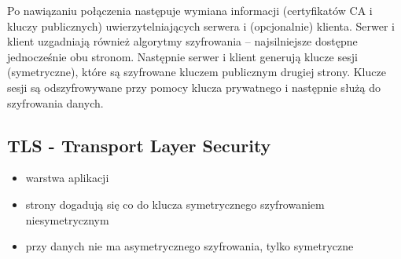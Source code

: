 \documentclass[../main.tex]{subfiles}
\begin{document}
    Po nawiązaniu połączenia następuje wymiana informacji (certyfikatów CA i kluczy publicznych)
    uwierzytelniających serwera i (opcjonalnie) klienta.
    Serwer i klient uzgadniają również algorytmy szyfrowania –
    najsilniejsze dostępne jednocześnie obu stronom.
    Następnie serwer i klient generują klucze sesji (symetryczne), które są szyfrowane kluczem
    publicznym drugiej strony. Klucze sesji są odszyfrowywane przy pomocy klucza prywatnego i
    następnie służą do szyfrowania danych.

    \subsection{TLS - Transport Layer Security}
    \begin{itemize}
        \item warstwa aplikacji
        \item strony dogadują się co do klucza symetrycznego szyfrowaniem niesymetrycznym
        \item przy danych nie ma asymetrycznego szyfrowania, tylko symetryczne
    \end{itemize}
\end{document}
